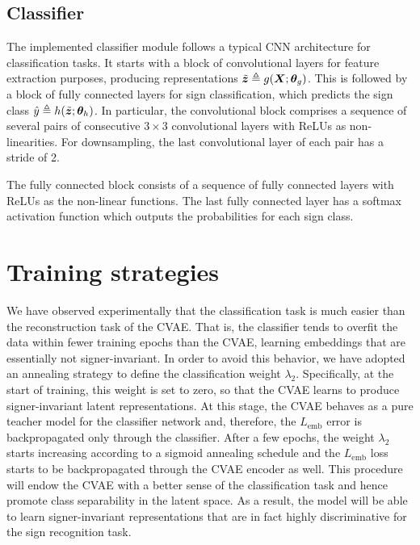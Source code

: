 \subsection{Classifier}
The implemented classifier module follows a typical CNN architecture for classification tasks. It starts with a block of convolutional layers for feature extraction purposes, producing representations $\tilde{{\bm{z}}} \triangleq g({\bm{X}};{\bm{\theta}}_g)$. This is followed by a block of fully connected layers for sign classification, which predicts the sign class $\hat{y} \triangleq h(\tilde{{\bm{z}}};{\bm{\theta}}_h)$. In particular, the convolutional block comprises a sequence of several pairs of consecutive $3 \times 3$ convolutional layers with ReLUs as non-linearities. For downsampling, the last convolutional layer of each pair has a stride of 2.

The fully connected block consists of a sequence of fully connected layers with ReLUs as the non-linear functions. The last fully connected layer has a softmax activation function which outputs the probabilities for each sign class.

\section{Training strategies}
\label{sec:desire_training_strat}

We have observed experimentally that the classification task is much easier than the reconstruction task of the CVAE. That is, the classifier tends to overfit the data within fewer training epochs than the CVAE, learning embeddings that are essentially not signer-invariant. In order to avoid this behavior, we have adopted an annealing strategy to define the classification weight $\lambda_2$. Specifically, at the start of training, this weight is set to zero, so that the CVAE learns to produce signer-invariant latent representations. At this stage, the CVAE behaves as a pure teacher model for the classifier network and, therefore, the $L_\text{emb}$ error is backpropagated only through the classifier. After a few epochs, the weight $\lambda_2$ starts increasing according to a sigmoid annealing schedule and the $L_\text{emb}$ loss starts to be backpropagated through the CVAE encoder as well. This procedure will endow the CVAE with a better sense of the classification task and hence promote class separability in the latent space. As a result, the model will be able to learn signer-invariant representations that are in fact highly discriminative for the sign recognition task.

